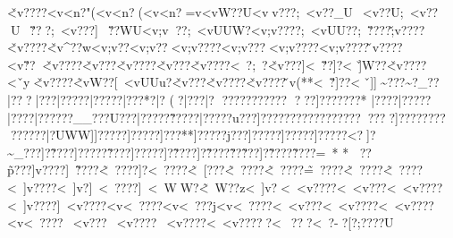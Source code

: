 {{{{{{{{{{{{{{{{{{{{{{{{{{{{{{{{{{{{{{{{{{{{{{{{{{{{{{{{{{{{{{{{{{{{{{{{{{{{{{{{{{{{{{{{{{{{{{{{{{{{{{{{{{{{{{{{{{{{{{{{{{{{{{{{{{{{{{{{{{{{{{{{{{{{{{{{{{{{{{{{{{{{{{{{{{{{{{{{{{{{{{{{{{{{{{{{{{{{{{{{{{{{{{{{{{{{{{{{{{{{{{{{{{{{{{{{{{{{{{{{{{{{{{{{{{{{{{{{{{{{{{{{{{{{{{{{{{{{{{{{{{{{{{{{{{{{{{{{{{{{{{{{{{{{{{{{{{{{{{{{{{{{{{{{{{{{{{{{{{{{{{{{{{{{{{{{{{{{{{{{{{{{{{{{{{{{{{{{{{{{{{{{{{{{{{{{{{{{{{{{{{{{{{{{{{{{{{{{{{{{{{{{{{{{{{{{{{{{{{{{{{{{{{{{{{{{{{{{{{{{{{{{{{{{{{{{{{{{{{{{{{{{{{{{{{{{{{{{{{{{{{{{{{{{{{{{{{{{{{{{{{{{{{{{{{{{{{{{{{{{{{{{{{{{{{{{{{{{{{{{{{{{{{{{{{{{{{{{{{{{{{{{{{{{{{{{{{{{{{{{{{{{{{{{{{{{{{{{{{{{{{{{{{{{{{{{{{{{{{{{{{{{{{{{{{{{{{{{{{{{{{{{{{{{{{{{{{{{{{{{{{{{{{{{{{{{{{{{{{{{{{{{{{{{{{{{{{{{{{{{{{{{{{{{{{{{{{{{{{{{{{{{{{{{{{{{{{{{{{{{{{{{{{{{{{{{{{{{{{{{{{{{{{{{{{{{{{{{{{{{{{{{{{{{{{{{{{{{{{{{{{{{{{{{{{{{{{{{{{{{{{{{{{{{{{{{{{{{{{{{{{{{{{{{{{{{{{{{{{{{{{{{{{{{{{{{{{{{{{{{{{{{{{{{{{{{{{{{{{{{{{{{{{{{{{{{{{{{{{{{{{{{{{{{{{{{{{{{{{{{{{{{{{{{{{{{{{{{{{{{{{{{{{{{{{{{{{{{{{{{{{{{{{{{{{{{{{{{{{{{{{{{{{{{{{{{{{{{{{{{{{{{{{{{{{{{{{{{{{{{{{{{{{{{{{{{{{{{{{{{{{{{{{{{{{{{{{{{{{{{{{{{{{{{{{{{{{{{{{{{{{{{{{{{{{{{{{{{{{{{{{{{{{{{{{{{{{{{{{{{{{{{{{{{{{{{{{{{{{{{{{{{{{{{{{{{{{{{{{{{{{{{{{{{{{{{{{{{{{{{{{{{{{{{{{{{{{{{{{{{{{{{{{{{{{{{{{{{{{{{{{{{{{{{{{{{{{{{{{{{{{{{{{{{{{{{{{{{{{{{{{{{{{{{{{{{{{{{{{{{{{{{{{{{{{{{{{{{{{{{{{{{{{{{{{{{{{{{{{{{{{{{{{{{{{{{{{{{{{{{{{{{{{{{{{{{{{{{{{{{{{{{{{{{{{{{{{{{{{{{{{{{{{{{{{{{{{{{{{{{{{{{{{{{{{{{{{{{{{{{{{{{{{{{{{{{{{{{{{{{{{{{{{{{{{{{{{{{{{{{{{{{{{{{{{{{{{{{{{{{{{{{{{{{{{{{{{{{{{{{{{{{{{{{{{{{{{{{{{{{{{{{{{{{{{{{{{{{{{{{{{{{{{{{{{{{{{{{{{{{{{{{{{{{{{{{{{{{{{{{{{{{{{{{{{{{{{{{{{{{{{{{{{{{{{{{{{{{{{{{{{{{{{{{{{{{{{{{{{{{{{{{{{{{{{{{{{{{{{{{{{{{{{{{{{{{{{{{{{{{{{{{{{{{{{{{{{{{{{{{{{{{{{{{{{{{{{{{{{{{{{{{{{{{{{{{{{{{{{{{{{{{{{{{{{{{{{{{{{{{{{{{{{{{{{{{{{{{{{{{{{{{{{{{{{{{{{{{{{{{{{{{{{{{{{{{{{{{{{{{{{{{{{{{{{{{{{{{{{{{{{{{{{{{{{{{{{{{{{{{{{{{{{{{{{{{{{{{{{{{{{{{{{{{{{{{{{{{{{{{{{{{{{{{{{{{{{{{{{{{{{{{{{{{{{{{{{{{{{{{{{{{{{{{{{{{{{{{{{{{{{{{{{{{{{{{{{{{{{{{{{{{{{{{{{{{{{{{{{{{{{{{{{{{{{{{{{{{{{{{{{{{{{{{{{{{{{{{{{{{{{{{{{{{{{{{{{{{{{{{{{{{{{{{{{{{{{{{{{{{{{{{{{{{{{{{{{{{{{{{{{{{{{{{{{{{{{{{{{{{{{{{{{{{{{{{{{{{{{{{{{{{{{{{{{{{{{{{{{{{\v<v????<v<n ?"(<v<n? (<v<n?  =v<vW??U<vv???;~<v??_U~<v??}U;~<v??U~\v???;~<v???]~\v??WU<v;v??;~<vUUW?<v;v????;~<vUU??;~\v????\v;v????\v<v????\v<v^??w<v;v?? <v;v?? <v;v????<v;v???<v;v????<v;v????\vv????<v\v??\v<v????\v<v???\v<v????\v<v??? \v<v????<~\vUU?};~\vUWU?\v<v???]<~\v??]?<~\v]W??\v<v????<~\v}y{\v<v????\~<vW}??[~<vUUu?\v<v???\v<v????\v<v????\vv (**<~\v?]??<~\v]]\~\vU???\~\vu?_?\?\??   |?\???|?\???|?\?????|?\?????|?\???*?|?\?
(?|?\???\?|? ??\?\???? \?\?????\?\??? \?\????]?\?????\?\???*
\?|????|?\?????|?\????|?\?????}?\?__??}?\?U???|?\?????\?\~??  \?\???? |?\?????\?\?u???\?]?????}?\?????}?\?????\?}?? }?\????]?\?????}?\????}?\?????|?\?UWW]\?]?????]?\?????\?]???**]?\?????\?\?j???\?]?????]?\?????]?\?????\?<?   ]?\~_???]?\~????]?\?????\?\~????]?\?????]?\~????]?\~????\?\~??\?\~???]?\~????\?\~????\?=~*
*
\?\???\?\~p???\?]v????]~\~????\~<~????]?<~????\~<~[???\~<~????\~<~????\~=~????\~<~????\~<~????<~]v????<~]v?   ]~<~????]~<~WW?\~<~W??z<~]v?  <~<v????<~<v ???<~<v????<~]v????]~<v????<v<~????<v<~???j<v<~????<~<v???<~<v????<~<v????<v<~????~<v???~<v????~<v????<~<v?????<~???<~?-?[?;????U}}}}}}}}}}}}}}}}}}}}}}}}}}}}}}}}}}}}}}}}}}}}}}}}}}}}}}}}}}}}}}}}}}}}}}}}}}}}}}}}}}}}}}}}}}}}}}}}}}}}}}}}}}}}}}}}}}}}}}}}}}}}}}}}}}}}}}}}}}}}}}}}}}}}}}}}}}}}}}}}}}}}}}}}}}}}}}}}}}}}}}}}}}}}}}}}}}}}}}}}}}}}}}}}}}}}}}}}}}}}}}}}}}}}}}}}}}}}}}}}}}}}}}}}}}}}}}}}}}}}}}}}}}}}}}}}}}}}}}}}}}}}}}}}}}}}}}}}}}}}}}}}}}}}}}}}}}}}}}}}}}}}}}}}}}}}}}}}}}}}}}}}}}}}}}}}}}}}}}}}}}}}}}}}}}}}}}}}}}}}}}}}}}}}}}}}}}}}}}}}}}}}}}}}}}}}}}}}}}}}}}}}}}}}}}}}}}}}}}}}}}}}}}}}}}}}}}}}}}}}}}}}}}}}}}}}}}}}}}}}}}}}}}}}}}}}}}}}}}}}}}}}}}}}}}}}}}}}}}}}}}}}}}}}}}}}}}}}}}}}}}}}}}}}}}}}}}}}}}}}}}}}}}}}}}}}}}}}}}}}}}}}}}}}}}}}}}}}}}}}}}}}}}}}}}}}}}}}}}}}}}}}}}}}}}}}}}}}}}}}}}}}}}}}}}}}}}}}}}}}}}}}}}}}}}}}}}}}}}}}}}}}}}}}}}}}}}}}}}}}}}}}}}}}}}}}}}}}}}}}}}}}}}}}}}}}}}}}}}}}}}}}}}}}}}}}}}}}}}}}}}}}}}}}}}}}}}}}}}}}}}}}}}}}}}}}}}}}}}}}}}}}}}}}}}}}}}}}}}}}}}}}}}}}}}}}}}}}}}}}}}}}}}}}}}}}}}}}}}}}}}}}}}}}}}}}}}}}}}}}}}}}}}}}}}}}}}}}}}}}}}}}}}}}}}}}}}}}}}}}}}}}}}}}}}}}}}}}}}}}}}}}}}}}}}}}}}}}}}}}}}}}}}}}}}}}}}}}}}}}}}}}}}}}}}}}}}}}}}}}}}}}}}}}}}}}}}}}}}}}}}}}}}}}}}}}}}}}}}}}}}}}}}}}}}}}}}}}}}}}}}}}}}}}}}}}}}}}}}}}}}}}}}}}}}}}}}}}}}}}}}}}}}}}}}}}}}}}}}}}}}}}}}}}}}}}}}}}}}}}}}}}}}}}}}}}}}}}}}}}}}}}}}}}}}}}}}}}}}}}}}}}}}}}}}}}}}}}}}}}}}}}}}}}}}}}}}}}}}}}}}}}}}}}}}}}}}}}}}}}}}}}}}}}}}}}}}}}}}}}}}}}}}}}}}}}}}}}}}}}}}}}}}}}}}}}}}}}}}}}}}}}}}}}}}}}}}}}}}}}}}}}}}}}}}}}}}}}}}}}}}}}}}}}}}}}}}}}}}}}}}}}}}}}}}}}}}}}}}}}}}}}}}}}}}}}}}}}}}}}}}}}}}}}}}}}}}}}}}}}}}}}}}}}}}}}}}}}}}}}}}}}}}}}}}}}}}}}}}}}}}}}}}}}}}}}}}}}}}}}}}}}}}}}}}}}}}}}}}}}}}}}}}}}}}}}}}}}}}}}}}}}}}}}}}}}}}}}}}}}}}}}}}}}}}}}}}}}}}}}}}}}}}}}}}}}}}}}}}}}}}}}}}}}}}}}}}}}}}}}}}}}}}}}}}}}}}}}}}}}}}}}}}}}}}}}}}}}}}}}}}}}}}}}}}}}}}}}}}}}}}}}}}}}}}}}}}}}}}}}}}}}}}}}}}}}}}}}}}}}}}}}}}}}}}}}}}}}}}}}}}}}}}}}}}}}}}}}}}}}}}}}}}}}}}}}}}}}}}}}}}}}}}}}}}}}}}}}}}}}}}}}}}}}}}}}}}}}}}}}}}}}}}}}}}}}}}}}}}}}}}}}}}}}}}}}}}}}}}}}}}}}}}}}}}}}}}}}}}}}}}}}}}}}}}}}}}}}}}}}}}}}}}}}}}}}}}}}}}}}}}}}}}}}}}}}}}}}}}}}}}}}}}}}}}}}}}}}}}}}}}}}}}}}}}}}}}}}}}}}}}}}}}}}}}}}}}}}}}}}}}}}}}}}}}}}}}}}}}}}}}}}}}}}}}}}}}}}}}}}}}}}}}}}}}}}}}}}}}}}}}}}}}}}}}}}}}}}}}}}}}}}}}}}}}}}}}}}}}}}}}}}}}}}}}}}}}}}}}}}}}}}}}}}}}}}}}}}}}}}}}}}}}}}}}}}}}}}}}}}}}}}}}}}}}}}}}}}}}}}}}}}}}}}}}}}}}}}}}}}}}}}}}}}}
